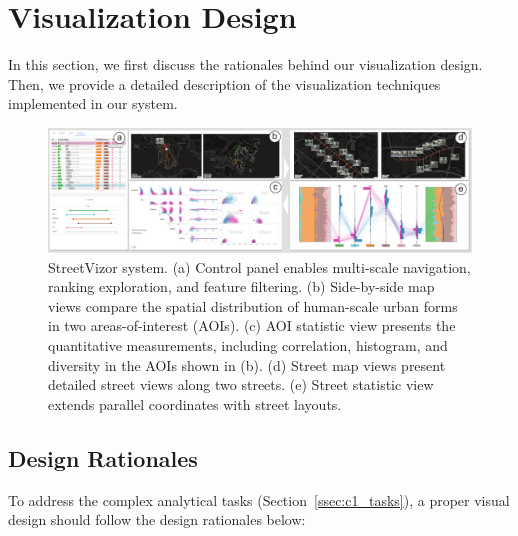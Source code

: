 \section{Visualization Design}

In this section, we first discuss the rationales behind our visualization design. 
Then, we provide a detailed description of the visualization techniques implemented in our system.


\begin{figure}[t] 
	\centering
	\includegraphics[width=0.98\columnwidth]{figure/streetvizor/fig1_teaser/teaser}
	\vspace{-3mm}
	\caption{StreetVizor system. 
		(a) Control panel enables multi-scale navigation, ranking exploration, and feature filtering.
		(b) Side-by-side map views compare the spatial distribution of human-scale urban forms in two areas-of-interest (AOIs).
		(c) AOI statistic view presents the quantitative measurements, including correlation, histogram, and diversity in the AOIs shown in (b).
		(d) Street map views present detailed street views along two streets.
		(e) Street statistic view extends parallel coordinates with street layouts.}
	\label{fig:c1_teaser}
	\vspace{-1mm}
\end{figure}



\subsection{Design Rationales}
To address the complex analytical tasks (Section~\ref{ssec:c1_tasks}), a proper visual design should follow the design rationales below:

